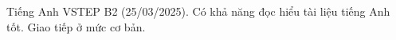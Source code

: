 
\begin{cvskills}

  \cvskill
    {Tiếng Anh} %
    {VSTEP B2 (25/03/2025). Có khả năng đọc hiểu tài liệu tiếng Anh tốt. Giao tiếp ở mức cơ bản.} %


\end{cvskills}

